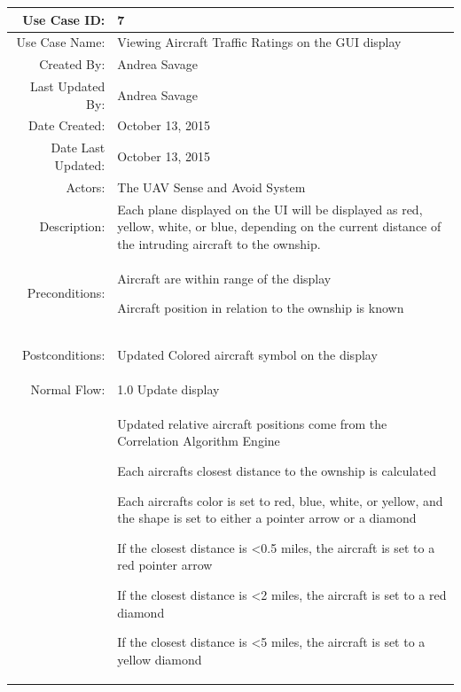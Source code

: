 \documentclass[12pt,oneside,letterpaper]{article}
\newenvironment{packed_enumerate}{ %
\vspace{-7mm}
\begin{enumerate}
  \setlength{\itemsep}{0pt}
  \setlength{\parskip}{0pt}
  \setlength{\parsep}{0pt}
}{\end{enumerate}
\vspace{-8mm}}
\begin{document}
\begin{longtable}{|r|p{3.8in}|}
\hline
Use Case ID:&7\\
\hline
Use Case Name:&Viewing Aircraft Traffic Ratings on the GUI display\\
\hline
Created By:&Andrea Savage\\
\hline
Last Updated By:&Andrea Savage\\
\hline
Date Created:&October 13, 2015\\
\hline
Date Last Updated:&October 13, 2015\\
\hline
Actors:&The UAV Sense and Avoid System\\
\hline
Description:&Each plane displayed on the UI will be displayed as red, yellow, white, or blue, depending on the current distance of the intruding aircraft to the ownship.\\
\hline
Preconditions:&
\begin{packed_enumerate}
\item Aircraft are within range of the display
\item Aircraft position in relation to the ownship is known
\end{packed_enumerate}\\
\hline
Postconditions:&
\begin{packed_enumerate}
\item Updated Colored aircraft symbol on the display
\end{packed_enumerate}\\
\hline
Normal Flow:&1.0 Update display\\
&  %
\begin{packed_enumerate}
\item Updated relative aircraft positions come from the Correlation Algorithm Engine
\item Each aircraft\textsc{\char13}s closest distance to the ownship is calculated
\item Each aircraft\textsc{\char13}s color is set to red, blue, white, or yellow, and the shape is set to either a pointer arrow or a diamond\newline
\begin{packed_enumerate}
\item If the closest distance is \textless 0.5 miles, the aircraft is set to a red pointer arrow
\item If the closest distance is \textless 2 miles, the aircraft is set to a red diamond
\item If the closest distance is \textless 5 miles, the aircraft is set to a yellow diamond

\end{packed_enumerate}
\end{packed_enumerate}
\end{longtable}
\end{document}
